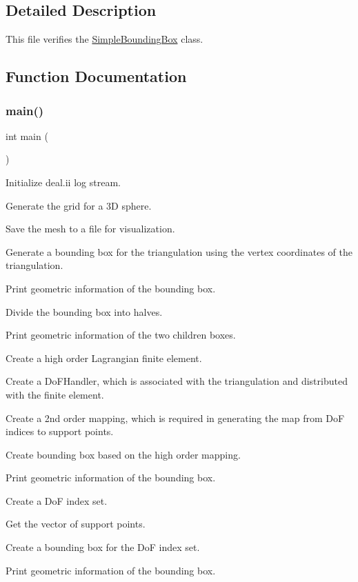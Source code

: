 \subsection{Detailed Description}
This file verifies the \hyperlink{classSimpleBoundingBox}{Simple\+Bounding\+Box} class. 

\subsection{Function Documentation}
\mbox{\label{simple-bounding-box_8cc_ae66f6b31b5ad750f1fe042a706a4e3d4}} 
\subsubsection{\texorpdfstring{main()}{main()}}
{\footnotesize\ttfamily int main (\begin{DoxyParamCaption}{ }\end{DoxyParamCaption})}

Initialize deal.\+ii log stream.

Generate the grid for a 3D sphere.

Save the mesh to a file for visualization.

Generate a bounding box for the triangulation using the vertex coordinates of the triangulation.

Print geometric information of the bounding box.

Divide the bounding box into halves.

Print geometric information of the two children boxes.

Create a high order Lagrangian finite element.

Create a Do\+F\+Handler, which is associated with the triangulation and distributed with the finite element.

Create a 2nd order mapping, which is required in generating the map from DoF indices to support points.

Create bounding box based on the high order mapping.

Print geometric information of the bounding box.

Create a DoF index set.

Get the vector of support points.

Create a bounding box for the DoF index set.

Print geometric information of the bounding box.